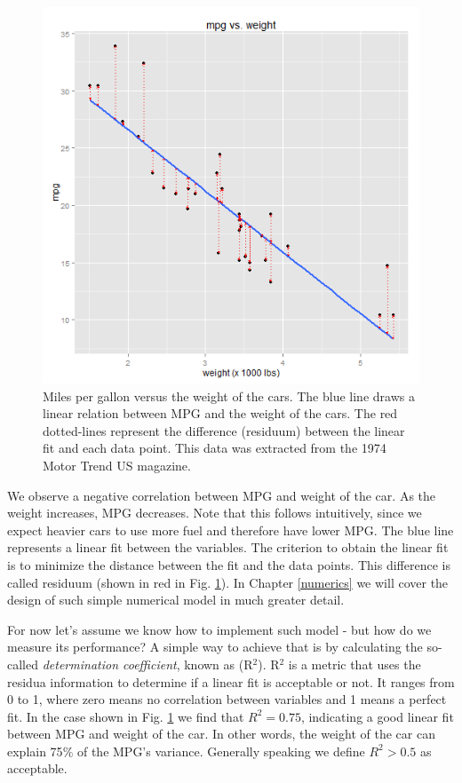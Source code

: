 \begin{figure}[h]
	\begin{center}
			\includegraphics[scale=0.35]{Parts/ch2/linregch2}
	\end{center}
	\caption{Miles per gallon versus the weight of the cars. The blue line draws a linear relation between MPG and the weight of the cars. The red dotted-lines represent the difference (residuum) between the linear fit and each data point. This data was extracted from the 1974 Motor Trend US magazine.}
	\label{fig:linR}
\end{figure} 

We observe a negative correlation between MPG and weight of the car. As the weight increases, MPG decreases. Note that this follows intuitively, since we expect heavier cars to use more fuel and therefore have lower MPG. The blue line represents a linear fit between the variables. The criterion to obtain the linear fit is to minimize the distance between the fit and the data points. This difference is called residuum (shown in red in Fig. \ref{fig:linR}). In Chapter \ref{numerics} we will cover the design of such simple numerical model in much greater detail. 

\newpage

For now let's assume we know how to implement such model - but how do we measure its performance? A simple way to achieve that is by calculating the so-called \textit{determination coefficient}, known as (R$^2$). R$^2$ is a metric that uses the residua information to determine if a linear fit is acceptable or not. It ranges from 0 to 1, where zero means no correlation between variables and 1 means a perfect fit. In the case shown in Fig. \ref{fig:linR} we find that $R^2=0.75$, indicating a good linear fit between MPG and weight of the car. In other words, the weight of the car can explain 75$\%$ of the MPG's variance. Generally speaking we define $R^2>0.5$ as acceptable. 

